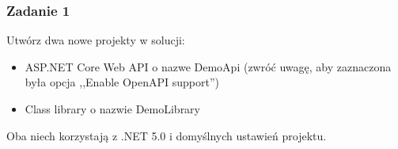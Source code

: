 %
%




\subsubsection{Zadanie 1}
Utwórz dwa nowe projekty w solucji:
\begin{itemize}
	\item ASP.NET Core Web API o nazwe DemoApi (zwróć uwagę, aby zaznaczona była opcja ,,Enable OpenAPI support'')
	\item Class library o nazwie DemoLibrary
\end{itemize}
Oba niech korzystają z .NET 5.0 i domyślnych ustawień projektu.

